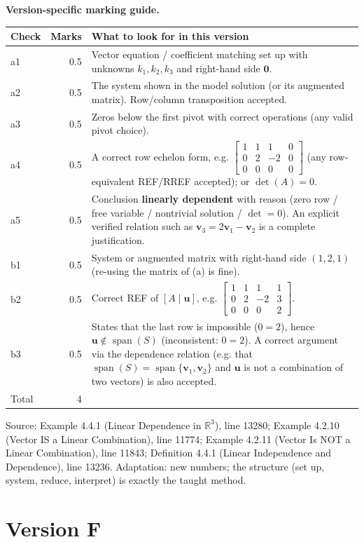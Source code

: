 \documentclass[11pt,a4paper]{article}
\newcommand{\Src}[1]{{\footnotesize\color{black!65}Source: #1}}
\begin{document}
\textbf{Version-specific marking guide.}\par
\begin{tabularx}{\linewidth}{@{}l r X@{}}\toprule Check & Marks & What to look for in this version\\\midrule
a1 & 0.5 & Vector equation / coefficient matching set up with unknowns $k_1,k_2,k_3$ and right-hand side $\mathbf{0}$.\\
a2 & 0.5 & The system shown in the model solution (or its augmented matrix). Row/column transposition accepted.\\
a3 & 0.5 & Zeros below the first pivot with correct operations (any valid pivot choice).\\
a4 & 0.5 & A correct row echelon form, e.g. $\left[\begin{array}{ccc|c} 1 & 1 & 1 & 0 \\ 0 & 2 & -2 & 0 \\ 0 & 0 & 0 & 0 \end{array}\right]$ (any row-equivalent REF/RREF accepted); or $\det(A)=0$.\\
a5 & 0.5 & Conclusion \textbf{linearly dependent} with reason (zero row / free variable / nontrivial solution / $\det=0$). An explicit verified relation such as $\mathbf{v}_3=2\mathbf{v}_1-\mathbf{v}_2$ is a complete justification.\\
b1 & 0.5 & System or augmented matrix with right-hand side $(1,2,1)$ (re-using the matrix of (a) is fine).\\
b2 & 0.5 & Correct REF of $[A\mid\mathbf{u}]$, e.g. $\left[\begin{array}{ccc|c} 1 & 1 & 1 & 1 \\ 0 & 2 & -2 & 3 \\ 0 & 0 & 0 & 2 \end{array}\right]$.\\
b3 & 0.5 & States that the last row is impossible ($0=2$), hence $\mathbf{u}\notin\operatorname{span}(S)$ (inconsistent: $0=2$). A correct argument via the dependence relation (e.g. that $\operatorname{span}(S)=\operatorname{span}\{\mathbf{v}_1,\mathbf{v}_2\}$ and $\mathbf{u}$ is not a combination of two vectors) is also accepted.\\
\midrule Total & 4 & \\\bottomrule\end{tabularx}
\Src{Example 4.4.1 (Linear Dependence in $\mathbb{R}^3$), line 13280; Example 4.2.10 (Vector IS a Linear Combination), line 11774; Example 4.2.11 (Vector Is NOT a Linear Combination), line 11843; Definition 4.4.1 (Linear Independence and Dependence), line 13236. Adaptation: new numbers; the structure (set up, system, reduce, interpret) is exactly the taught method.}\par
\clearpage\section*{Version F}
\end{document}

